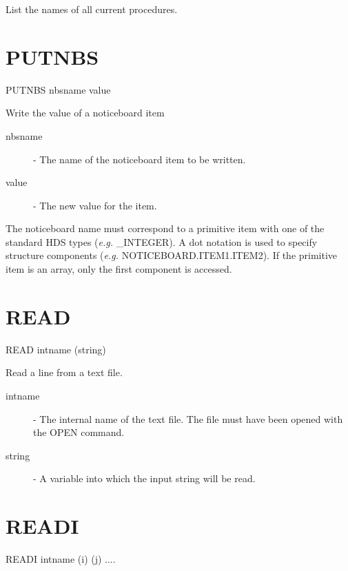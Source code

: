  List the names of all current procedures.

\section{PUTNBS}

   PUTNBS \hspace{.5cm}  nbsname \hspace{.5cm} value

Write the value of a noticeboard item

\begin{description}

\item[nbsname] - The name of the noticeboard item to be written.

\item[value] - The new value for the item.

\end{description}                                

The noticeboard name must correspond to a primitive item with one of the
standard HDS types ({\em e.g.} \_INTEGER). 
A dot notation is used to specify structure
components ({\em e.g.} NOTICEBOARD.ITEM1.ITEM2). 
If the primitive item is an array, only the first component is accessed.


\section{READ}

   READ \hspace{.5cm} intname \hspace{.5cm}  (string)

 Read a line from a text file.
\begin{description}

\item[intname]  -  The internal name of the text file. The file must have
                   been opened with the OPEN command.

\item[string]  -  A variable into which the input string will be read.

\end{description}


\section{READI}


    READI \hspace{.5cm} intname \hspace{.5cm} (i) \hspace{.5cm} (j)  ....

